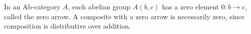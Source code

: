 In an $\text{Ab}$-category $A$, each abelian group $A(b,c)$ has a zero element $0 : b \rightarrow c$, called the zero arrow. A composite with a zero arrow is necessarily zero, since composition is distributive over addition.
